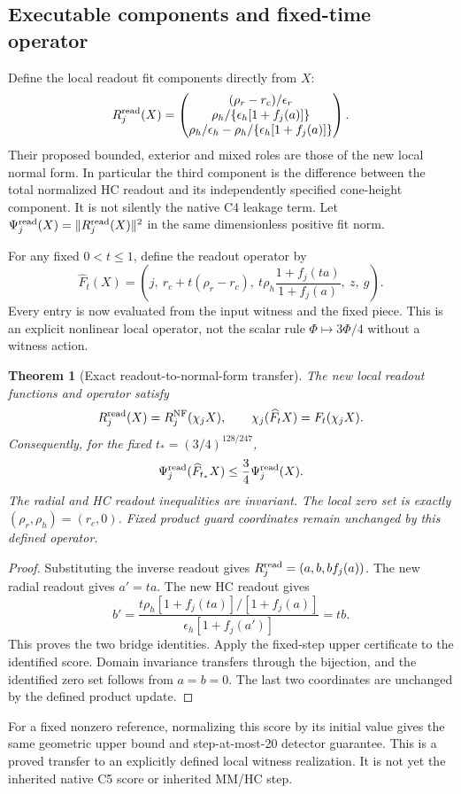 \documentclass[11pt,a4paper]{article}
\newtheorem{theorem}{Theorem}
\begin{document}
\subsection{Executable components and fixed-time operator}
Define the local readout fit components directly from $X$:
\[
R_j^{\rm read}(X)=
\begin{pmatrix}
(\rho_r-r_c)/\epsilon_r\\
\rho_h/\{\epsilon_h[1+f_j(a)]\}\\
\rho_h/\epsilon_h-\rho_h/\{\epsilon_h[1+f_j(a)]\}
\end{pmatrix}.
\]
Their proposed bounded, exterior and mixed roles are those of the new
local normal form. In particular the third component is the difference
between the total normalized HC readout and its independently specified
cone-height component. It is not silently the native C4 leakage term.
Let $\Psi_j^{\rm read}(X)=\|R_j^{\rm read}(X)\|^2$ in the same
dimensionless positive fit norm.

For any fixed $0<t\le1$, define the readout operator by
\[
\widehat F_t(X)=
\left(j,\ r_c+t(\rho_r-r_c),\
t\rho_h\frac{1+f_j(ta)}{1+f_j(a)},\ z,\ g\right).
\]
Every entry is now evaluated from the input witness and the fixed piece.
This is an explicit nonlinear local operator, not the scalar rule
$\Phi\mapsto3\Phi/4$ without a witness action.

\begin{theorem}[Exact readout-to-normal-form transfer]
\label{thm:explicit-readout-transfer}
The new local readout functions and operator satisfy
\[
R_j^{\rm read}(X)=R_j^{\rm NF}(\chi_jX),\qquad
\chi_j(\widehat F_tX)=F_t(\chi_jX).
\]
Consequently, for the fixed $t_*=(3/4)^{128/247}$,
\[
\Psi_j^{\rm read}(\widehat F_{t_*}X)
\le\frac34\Psi_j^{\rm read}(X).
\]
The radial and HC readout inequalities are invariant. The local zero set
is exactly $(\rho_r,\rho_h)=(r_c,0)$. Fixed product guard coordinates
remain unchanged by this defined operator.
\end{theorem}
\begin{proof}
Substituting the inverse readout gives
$R_j^{\rm read}=(a,b,bf_j(a))$.
The new radial readout gives $a'=ta$. The new HC readout gives
\[
b'=\frac{t\rho_h[1+f_j(ta)]/[1+f_j(a)]}
{\epsilon_h[1+f_j(a')]}
=tb.
\]
This proves the two bridge identities. Apply the fixed-step upper
certificate to the identified score. Domain invariance transfers through
the bijection, and the identified zero set follows from $a=b=0$.
The last two coordinates are unchanged by the defined product update.
\end{proof}
For a fixed nonzero reference, normalizing this score by its initial value
gives the same geometric upper bound and step-at-most-20 detector guarantee.
This is a proved transfer to an explicitly defined local witness realization.
It is not yet the inherited native C5 score or inherited MM/HC step.
\end{document}

